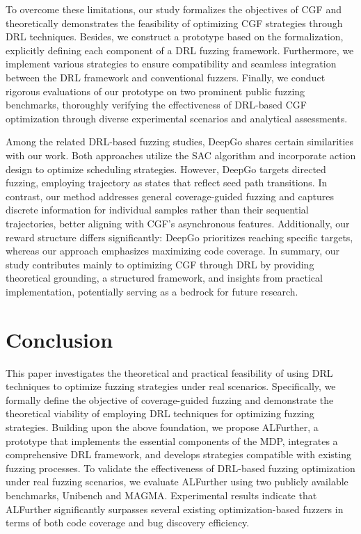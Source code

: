 \documentclass[lettersize,journal]{IEEEtran}
\begin{document}
To overcome these limitations, our study formalizes the objectives of CGF and theoretically demonstrates the feasibility of optimizing CGF strategies through DRL techniques. Besides, we construct a prototype based on the formalization, explicitly defining each component of a DRL fuzzing framework. Furthermore, we implement various strategies to ensure compatibility and seamless integration between the DRL framework and conventional fuzzers. Finally, we conduct rigorous evaluations of our prototype on two prominent public fuzzing benchmarks, thoroughly verifying the effectiveness of DRL-based CGF optimization through diverse experimental scenarios and analytical assessments.

Among the related DRL-based fuzzing studies, DeepGo \cite{linDeepGoPredictiveDirected2024} shares certain similarities with our work. Both approaches utilize the SAC \cite{haarnojaSoftActorcriticOffpolicy2018} algorithm and incorporate action design to optimize scheduling strategies. However, DeepGo targets directed fuzzing, employing trajectory as states that reflect seed path transitions. In contrast, our method addresses general coverage-guided fuzzing and captures discrete information for individual samples rather than their sequential trajectories, better aligning with CGF's asynchronous features. Additionally, our reward structure differs significantly: DeepGo prioritizes reaching specific targets, whereas our approach emphasizes maximizing code coverage. In summary, our study contributes mainly to optimizing CGF through DRL by providing theoretical grounding, a structured framework, and insights from practical implementation, potentially serving as a bedrock for future research.

\section{Conclusion}\label{sec:conclusion}

This paper investigates the theoretical and practical feasibility of using DRL techniques to optimize fuzzing strategies under real scenarios. Specifically, we formally define the objective of coverage-guided fuzzing and demonstrate the theoretical viability of employing DRL techniques for optimizing fuzzing strategies. Building upon the above foundation, we propose ALFurther, a prototype that implements the essential components of the MDP, integrates a comprehensive DRL framework, and develops strategies compatible with existing fuzzing processes.	To validate the effectiveness of DRL-based fuzzing optimization under real fuzzing scenarios, we evaluate ALFurther using two publicly available benchmarks, Unibench and MAGMA. Experimental results indicate that ALFurther significantly surpasses several existing optimization-based fuzzers in terms of both code coverage and bug discovery efficiency.
\end{document}
